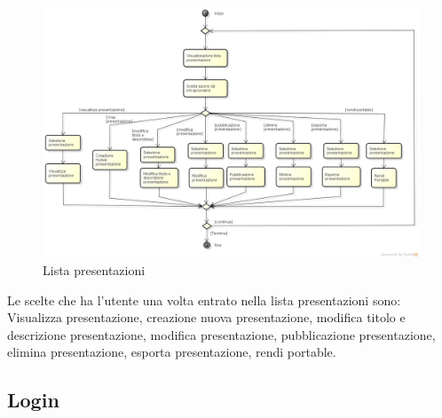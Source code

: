 \begin{figure}[h!]
		\centering
		\includegraphics[scale=.2]{img/ListaPresentazioni.jpg}
		\caption{Lista presentazioni}
		\label{fig:ModelloSpy}
\end{figure}

Le scelte che ha l'utente una volta entrato nella lista presentazioni sono: Visualizza presentazione, creazione nuova presentazione, modifica titolo e descrizione presentazione, modifica presentazione, pubblicazione presentazione, elimina presentazione, esporta presentazione, rendi portable.

\subsection{Login}

